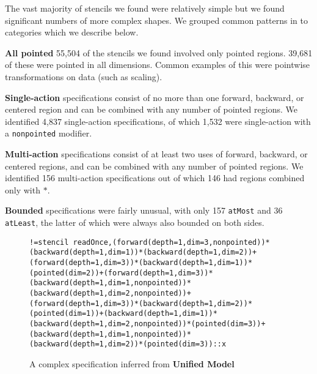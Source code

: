 \documentclass[10pt,preprint]{sigplanconf}
\theoremstyle{definition}
\newcommand{\term}[1]{\texttt{#1}}
\begin{document}
%


The vast majority of stencils we found were relatively simple but we
found significant numbers of more complex shapes. We grouped common
patterns in to categories which we describe below.

\textbf{All pointed} 55,504 of the stencils we found involved 
only pointed regions. 39,681 of these were pointed in all
dimensions. Common examples of this were pointwise transformations on
data (such as scaling).

\textbf{Single-action} specifications consist of no more than one 
forward, backward, or centered region and can be combined with any
number of pointed regions. We identified 4,837 single-action
specifications, of which 1,532 were single-action with a
\texttt{nonpointed} modifier.

\textbf{Multi-action} specifications consist of at least two uses 
of forward, backward, or centered regions, and can be combined with
any number of pointed regions. We identified 156 multi-action
specifications out of which 146 had regions combined only with
$\term{*}$.

\textbf{Bounded} specifications were fairly unusual, with only 157
\texttt{atMost} and 36 \texttt{atLeast}, the latter of which were
always also bounded on both sides.

\begin{figure}[t]\begin{verbatim}
!=stencil readOnce,(forward(depth=1,dim=3,nonpointed))*(backward(depth=1,dim=1))*(backward(depth=1,dim=2))+(forward(depth=1,dim=3))*(backward(depth=1,dim=1))*(pointed(dim=2))+(forward(depth=1,dim=3))*(backward(depth=1,dim=1,nonpointed))*(backward(depth=1,dim=2,nonpointed))+(forward(depth=1,dim=3))*(backward(depth=1,dim=2))*(pointed(dim=1))+(backward(depth=1,dim=1))*(backward(depth=1,dim=2,nonpointed))*(pointed(dim=3))+(backward(depth=1,dim=1,nonpointed))*(backward(depth=1,dim=2))*(pointed(dim=3))::x
\end{verbatim}
\caption{A complex specification inferred from
  \textbf{Unified Model}\label{fig:smagorinsky}}
\vspace{-1em}
\end{figure}
\end{document}
